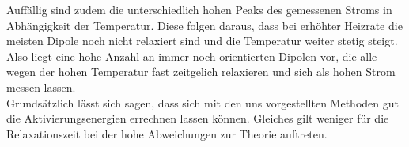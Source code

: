 Auffällig sind zudem die unterschiedlich hohen Peaks des gemessenen Stroms in Abhängigkeit der Temperatur. 
Diese folgen daraus, dass bei erhöhter Heizrate die meisten Dipole noch nicht relaxiert sind und die Temperatur weiter stetig steigt.
Also liegt eine hohe Anzahl an immer noch orientierten Dipolen vor, die alle wegen der hohen Temperatur fast zeitgelich relaxieren und sich 
als hohen Strom messen lassen.
\\
\newline
Grundsätzlich lässt sich sagen, dass sich mit den uns vorgestellten Methoden gut die Aktivierungsenergien errechnen lassen können.
Gleiches gilt weniger für die Relaxationszeit bei der hohe Abweichungen zur Theorie auftreten. 

























